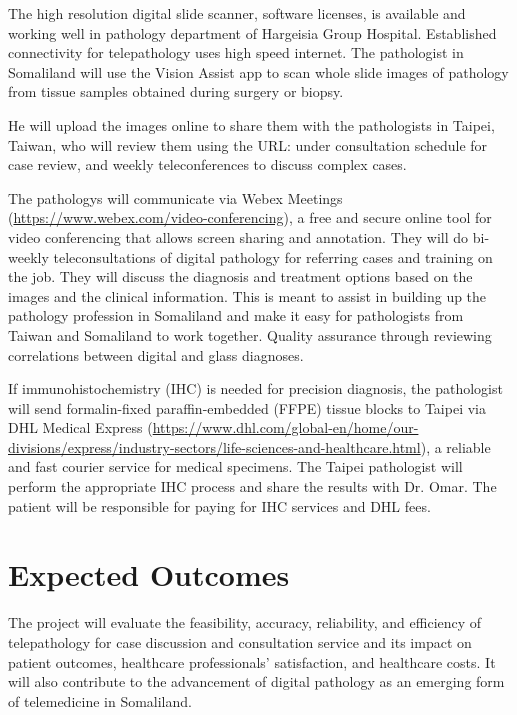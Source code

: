 \documentclass{article}
\begin{document}
\begin{outline}
    \1 The high resolution digital slide scanner, software licenses, is available and working well in pathology department of Hargeisia Group Hospital.
    \1 Established connectivity for telepathology uses high speed internet.
	\1 The pathologist in Somaliland will use the Vision Assist app to scan whole slide images of pathology from tissue samples obtained during surgery or biopsy.
    
    \1 He will upload the images online to share them with the pathologists in Taipei, Taiwan, who will review them using the URL: \url{}
    under consultation schedule for case review, and weekly teleconferences to discuss complex cases.


        \2 The pathologys will communicate via Webex Meetings (\url{https://www.webex.com/video-conferencing}), a free and secure online tool for video conferencing that allows screen sharing and annotation. They will do bi-weekly teleconsultations of digital pathology for referring cases and training on the job. They will discuss the diagnosis and treatment options based on the images and the clinical information. This is meant to assist in building up the pathology profession in Somaliland and make it easy for pathologists from Taiwan and Somaliland to work together.
        \2 Quality assurance through reviewing correlations between digital and glass diagnoses.
    
    \1 If immunohistochemistry (IHC) is needed for precision diagnosis, the pathologist will send formalin-fixed paraffin-embedded (FFPE) tissue blocks to Taipei via DHL Medical Express (\url{https://www.dhl.com/global-en/home/our-divisions/express/industry-sectors/life-sciences-and-healthcare.html}), a reliable and fast courier service for medical specimens. The Taipei pathologist will perform the appropriate IHC process and share the results with Dr. Omar. The patient will be responsible for paying for IHC services and DHL fees.

 
\end{outline}

\section{Expected Outcomes}
The project will evaluate the feasibility, accuracy, reliability, and efficiency of telepathology for case discussion and consultation service and its impact on patient outcomes, healthcare professionals’ satisfaction, and healthcare costs. It will also contribute to the advancement of digital pathology as an emerging form of telemedicine in Somaliland.
\end{document}
